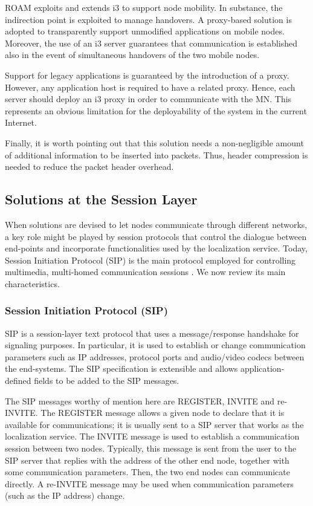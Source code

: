 \documentclass[preprint,12pt]{elsarticle}
\begin{document}
ROAM \cite{Zhuang:2005} exploits and extends i3 to support node mobility. In 
substance, the indirection point is exploited to manage handovers. 
A proxy-based solution is adopted to transparently support unmodified 
applications on mobile nodes. Moreover, the use of an i3 server guarantees that 
communication is established also in the event of simultaneous handovers of the two mobile nodes. 

Support for legacy applications is guaranteed by the introduction of a proxy. However, any application host is required to have a related proxy. Hence, each server should deploy an i3 proxy in order to communicate with the MN. This represents an obvious limitation for the deployability of the system in the current Internet.

Finally, it is worth pointing out that this solution needs a non-negligible amount 
of additional information to be inserted into packets. Thus, header compression is 
needed to reduce the packet header overhead.


\subsection{Solutions at the Session Layer}

When solutions are devised to let nodes communicate through different networks, 
a key role might be played by session protocols that control the dialogue 
between end-points and incorporate functionalities used by the localization 
service. 
Today, Session Initiation Protocol (SIP) is the main protocol employed for 
controlling multimedia, multi-homed communication sessions 
\cite{RFC3261,Schulzrinne:2000}. We now review its main characteristics.

\subsubsection{Session Initiation Protocol (SIP)}

SIP is a session-layer text protocol that uses a message/response handshake for 
signaling purposes. In particular, it is used to establish or change 
communication parameters such as IP addresses, protocol ports and audio/video 
codecs between the end-systems. The SIP specification is extensible and allows 
application-defined fields to be added to the SIP messages. 

The SIP messages worthy of mention here are REGISTER, INVITE and re-INVITE. 
The REGISTER message allows a given node to declare that it is available for 
communications; it is usually sent to a SIP server that works as the 
localization service. The INVITE message is used to establish a communication 
session between two nodes. Typically, this message is sent from the user to the 
SIP server that replies with the address of the other end node, together with 
some communication parameters. 
Then, the two end nodes can communicate directly. A re-INVITE message may be 
used when communication parameters (such as the IP address) change. 
\end{document}
